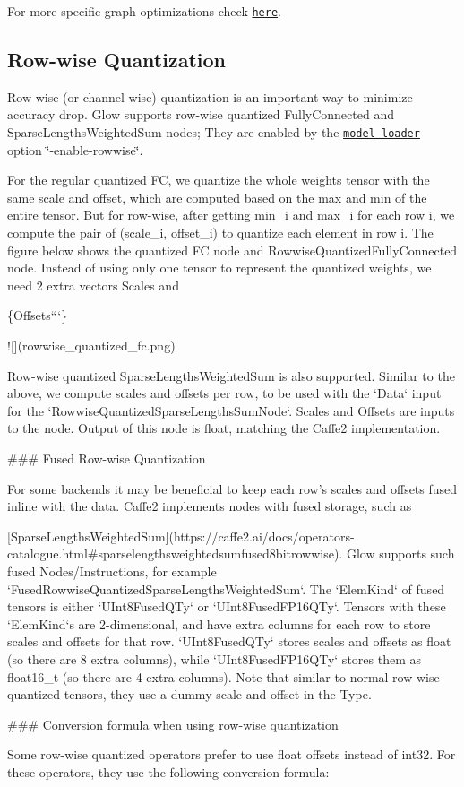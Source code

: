 For more specific graph optimizations check \href{Optimizations.md#quantization-specific-optimizations}{\tt here}.

\subsection*{Row-\/wise Quantization}

Row-\/wise (or channel-\/wise) quantization is an important way to minimize accuracy drop. Glow supports row-\/wise quantized Fully\+Connected and Sparse\+Lengths\+Weighted\+Sum nodes; They are enabled by the \href{Testing.md#model-loader}{\tt model loader} option \char`\"{}-\/enable-\/rowwise\char`\"{}.

For the regular quantized FC, we quantize the whole weights tensor with the same scale and offset, which are computed based on the max and min of the entire tensor. But for row-\/wise, after getting {\ttfamily min\+\_\+i} and {\ttfamily max\+\_\+i} for each row {\ttfamily i}, we compute the pair of {\ttfamily (scale\+\_\+i, offset\+\_\+i)} to quantize each element in row {\ttfamily i}. The figure below shows the quantized FC node and Rowwise\+Quantized\+Fully\+Connected node. Instead of using only one tensor to represent the quantized weights, we need 2 extra vectors {\ttfamily Scales} and 
\begin{DoxyCode}
\{Offsets```\}


![](rowwise\_quantized\_fc.png)

Row-wise quantized SparseLengthsWeightedSum is also supported. Similar to the
above, we compute scales and offsets per row, to be used with the `Data` input
for the `RowwiseQuantizedSparseLengthsSumNode`. Scales and Offsets are inputs to
the node. Output of this node is float, matching the Caffe2 implementation.

### Fused Row-wise Quantization

For some backends it may be beneficial to keep each row's scales and offsets
fused inline with the data. Caffe2 implements nodes with fused storage, such as

      [SparseLengthsWeightedSum](https://caffe2.ai/docs/operators-catalogue.html#sparselengthsweightedsumfused8bitrowwise). Glow
supports such fused Nodes/Instructions, for example
`FusedRowwiseQuantizedSparseLengthsWeightedSum`. The `ElemKind` of fused tensors
is either `UInt8FusedQTy` or `UInt8FusedFP16QTy`. Tensors with these `ElemKind`s
are 2-dimensional, and have extra columns for each row to store scales and
offsets for that row. `UInt8FusedQTy` stores scales and offsets as float (so
there are 8 extra columns), while `UInt8FusedFP16QTy` stores them as float16\_t
(so there are 4 extra columns). Note that similar to normal row-wise quantized
tensors, they use a dummy scale and offset in the Type.

### Conversion formula when using row-wise quantization

Some row-wise quantized operators prefer to use float offsets instead of
int32. For these operators, they use the following conversion formula:
\end{DoxyCode}
